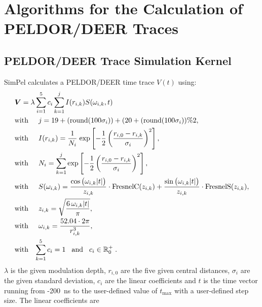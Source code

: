 \documentclass[pdftex,bezier,german,a4,twoside, headexclude,12pt,nochapterprefix, titlepage]{extarticle}
\newcommand{\simpel}{\textsf{SimPel} }
\begin{document}
\section{Algorithms for the Calculation of PELDOR/DEER Traces}
\subsection{PELDOR/DEER Trace Simulation Kernel}
\simpel calculates a PELDOR/DEER time trace $V(t)$ using:
\begin{align}
\begin{split}
& \boldsymbol{V}=  \lambda \sum_{i=1}^5 c_i\sum_{k=1}^{j}I(r_{i,k})S(\omega_{i,k},t) \\
&\mbox{with}\hspace{0.5cm} j =  19+(\mathrm{round}(100\sigma_i)) + (20+(\mathrm{round}(100\sigma_i))\%2,\\
&\mbox{with}\hspace{0.5cm} I(r_{i,k}) =\dfrac{1}{N_{i}} \;
\mathrm{exp}\left[-\frac{1}{2}\left(\frac{r_{i,0}-r_{i,k}}{\sigma_i}\right)^2\right],\\
&\mbox{with}\hspace{0.5cm} N_{i} = \sum_{k=1}^{j}\mathrm{exp}\left[-\frac{1}{2}\left(\frac{r_{i,0}-r_{i,k}}{\sigma_i}\right)^2\right] ,\\
&\mbox{with}\hspace{0.5cm}S(\omega_{i,k}) = 
\frac{\cos{\big(\omega_{i,k}|t| \big)}}{z_{i,k}} \cdot \text{FresnelC}(z_{i,k})  + 
   \frac{\sin{\big(\omega_{i,k} |t|\big)}}{z_{i,k}} \cdot \text{FresnelS}(z_{i,k}),\\
  &\mbox{with}\hspace{0.5cm}  z_{i,k} = \sqrt{\frac{6\,\omega_{i,k} |t| }{\pi}},\\
&\mbox{with}\hspace{0.5cm} \omega_{i,k} = \dfrac{52.04\cdot 2 \pi}{r_{i,k}^3},\\ 
&\mbox{with}\hspace{0.3cm} \sum_{k=1}^{5}c_i = 1 \hspace{0.3cm}
\mbox{and}\hspace{0.3cm}c_i \in\mathbb{R}^+_0\; .
\label{PELDOR_kernel_function}
\end{split}
\end{align}
$\lambda$ is the given modulation depth, $r_{i,0}$ are the five given central distances, $\sigma_i$ are
the given standard deviation, $c_i$ are the linear coefficients and $t$ is the time vector running
from -200~ns to the user-defined value of $t_{\mathrm{max}}$ with a user-defined step size. The linear coefficients are
\end{document}

